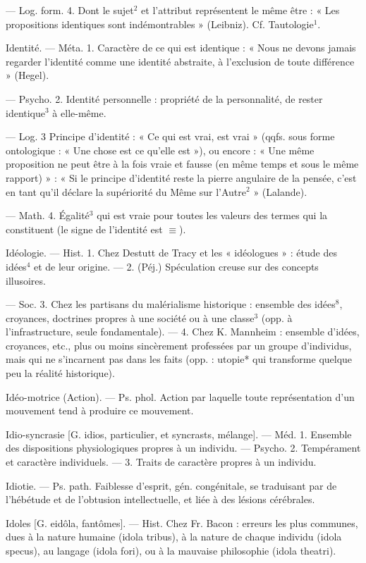— Log. form. 4. Dont le sujet$^2$ et
l’attribut représentent le même être :
« Les propositions identiques sont
indémontrables » (Leibniz). Cf. Tautologie$^1$.

Identité. — Méta. 1. Caractère de ce
qui est identique : « Nous ne devons
jamais regarder l'identité comme
une identité abstraite, à l'exclusion
de toute différence » (Hegel).

— Psycho. 2. Identité personnelle : propriété de la personnalité,
de rester identique$^3$ à elle-même.

— Log. 3 Principe d'identité :
« Ce qui est vrai, est vrai » (qqfs.
sous forme ontologique : « Une chose
est ce qu’elle est »), ou encore :
« Une même proposition ne peut être
à la fois vraie et fausse (en même
temps et sous le même rapport) » :
« Si le principe d'identité reste la
pierre angulaire de la pensée, c’est
en tant qu'il déclare la supériorité
du Même sur l’Autre$^2$ » (Lalande).

— Math. 4. Égalité$^3$ qui est vraie
pour toutes les valeurs des termes
qui la constituent (le signe de l’identité est $\equiv$).

Idéologie. — Hist. 1. Chez Destutt de
Tracy et les « idéologues » : étude des
idées$^4$ et de leur origine. — 2. (Péj.)
Spéculation creuse sur des concepts
illusoires.

— Soc. 3. Chez les partisans du
malérialisme historique : ensemble
des idées$^8$, croyances, doctrines
propres à une société ou à une
classe$^3$ (opp. à l'infrastructure, seule
fondamentale). — 4. Chez K. Mannheim : ensemble d'idées, croyances, etc., plus ou moins sincèrement
professées par un groupe d’individus, mais qui ne s’incarnent pas
dans les faits (opp. : utopie* qui
transforme quelque peu la réalité
historique).

Idéo-motrice (Action). — Ps. phol.
Action par laquelle toute représentation d’un mouvement tend à produire ce mouvement.

Idio-syncrasie [G. idios, particulier,
et syncrasts, mélange]. — Méd. 1.
Ensemble des dispositions physiologiques propres à un individu. —
Psycho. 2. Tempérament et caractère individuels. — 3. Traits de
caractère propres à un individu.

Idiotie. — Ps. path. Faiblesse d’esprit,
gén. congénitale, se traduisant par
de l’hébétude et de l’obtusion intellectuelle, et liée à des lésions cérébrales.

Idoles [G. eidôla, fantômes]. — Hist.
Chez Fr. Bacon : erreurs les plus
communes, dues à la nature humaine (idola tribus), à la nature de
chaque individu (idola specus), au
langage (idola fori), ou à la mauvaise
philosophie (idola theatri).

